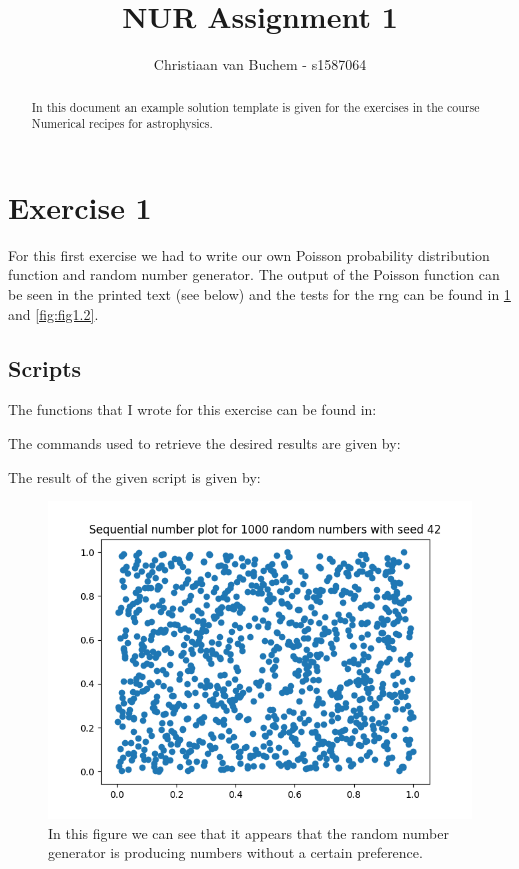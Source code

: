 \documentclass[a4paper,10pt]{article}
\title{NUR Assignment 1}
\author{Christiaan van Buchem - s1587064}
\begin{document}
\maketitle

\begin{abstract}
 In this document an example solution template is given for the exercises in the 
 course Numerical recipes for astrophysics.
\end{abstract}

\section{Exercise 1}

For this first exercise we had to write our own Poisson probability distribution function and random number generator. The output of the Poisson function can be seen in the printed text (see below) and the tests for the rng can be found in \ref{fig:fig1.1} and \ref{fig:fig1.2}.

\subsection{Scripts}
The functions that I wrote for this exercise can be found in: 


The commands used to retrieve the desired results are given by:


The result of the given script is given by:



\begin{figure}[h!]
  \centering
  \includegraphics[width=0.9\linewidth]{./plots/1_b_1.png}
  \caption{In this figure we can see that it appears that the random number generator is producing numbers without a certain preference.}
  \label{fig:fig1.1}
\end{figure}
\end{document}
